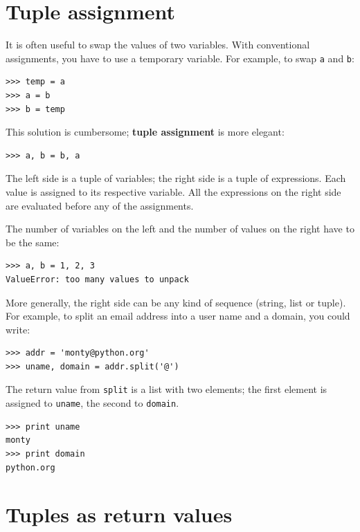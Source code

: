 \documentclass[10pt]{book}
\begin{document}
\begin{CJK}{UTF8}{gbsn}
\section{Tuple assignment}
\label{tuple.assignment}

It is often useful to swap the values of two variables.
With conventional assignments, you have to use a temporary
variable.  For example, to swap {\tt a} and {\tt b}:

\begin{verbatim}
>>> temp = a
>>> a = b
>>> b = temp
\end{verbatim}
%
This solution is cumbersome; {\bf tuple assignment} is more elegant:

\begin{verbatim}
>>> a, b = b, a
\end{verbatim}
%
The left side is a tuple of variables; the right side is a tuple of
expressions.  Each value is assigned to its respective variable.  
All the expressions on the right side are evaluated before any
of the assignments.

The number of variables on the left and the number of
values on the right have to be the same:

\begin{verbatim}
>>> a, b = 1, 2, 3
ValueError: too many values to unpack
\end{verbatim}
%
More generally, the right side can be any kind of sequence
(string, list or tuple).  For example, to split an email address
into a user name and a domain, you could write:

\begin{verbatim}
>>> addr = 'monty@python.org'
>>> uname, domain = addr.split('@')
\end{verbatim}
%
The return value from {\tt split} is a list with two elements;
the first element is assigned to {\tt uname}, the second to
{\tt domain}.

\begin{verbatim}
>>> print uname
monty
>>> print domain
python.org
\end{verbatim}
%

\section{Tuples as return values}


\end{CJK}
\end{document}
